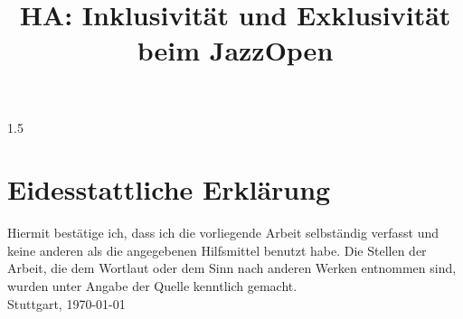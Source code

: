 \documentclass[12pt,a4paper,titlepage,oneside]{report} %
\title{HA: Inklusivität und Exklusivität beim JazzOpen}
\author{}
\date{}
\begin{document}
\newpage %
\fancyhf{} %
\begin{spacing}{1.5} %
\newpage

\renewcommand{\thesection}{\arabic{section}}


\fancyhead[L]{\nouppercase\leftmark} %
\fancyhead[R]{\thepage} %
\tableofcontents %
\newpage

\setcounter{section}{0}


\begingroup
  \renewcommand\clearpage{\relax}
  \listoftables
  \listoffigures
\endgroup

\newpage


 



 





\printbibliography[heading=bibintoc,title=Literaturverzeichnis] %

\newpage
\chapter*{Eidesstattliche Erklärung} 

Hiermit bestätige ich, dass ich die vorliegende Arbeit selbständig verfasst und keine anderen als die angegebenen Hilfsmittel benutzt habe. Die Stellen der Arbeit, die dem Wortlaut oder dem Sinn nach anderen Werken entnommen sind, wurden unter Angabe der Quelle kenntlich gemacht.
\\%
Stuttgart, \today

\fancyhead[R]{\thepage} %



\end{spacing} %
\end{document}
